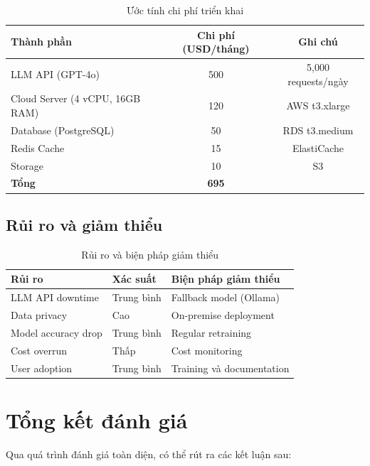 \documentclass[12pt,a4paper]{report}
\begin{document}
\begin{table}[H]
\centering
\caption{Ước tính chi phí triển khai}
\begin{tabular}{|p{5cm}|c|c|}
\hline
\textbf{Thành phần} & \textbf{Chi phí (USD/tháng)} & \textbf{Ghi chú} \\
\hline
LLM API (GPT-4o) & 500 & 5,000 requests/ngày \\
\hline
Cloud Server (4 vCPU, 16GB RAM) & 120 & AWS t3.xlarge \\
\hline
Database (PostgreSQL) & 50 & RDS t3.medium \\
\hline
Redis Cache & 15 & ElastiCache \\
\hline
Storage & 10 & S3 \\
\hline
\textbf{Tổng} & \textbf{695} & \\
\hline
\end{tabular}
\label{tab:cost_estimate}
\end{table}

\subsection{Rủi ro và giảm thiểu}

\begin{table}[H]
\centering
\caption{Rủi ro và biện pháp giảm thiểu}
\begin{tabular}{|p{4.5cm}|p{4.5cm}|p{5cm}|}
\hline
\textbf{Rủi ro} & \textbf{Xác suất} & \textbf{Biện pháp giảm thiểu} \\
\hline
LLM API downtime & Trung bình & Fallback model (Ollama) \\
\hline
Data privacy & Cao & On-premise deployment \\
\hline
Model accuracy drop & Trung bình & Regular retraining \\
\hline
Cost overrun & Thấp & Cost monitoring \\
\hline
User adoption & Trung bình & Training và documentation \\
\hline
\end{tabular}
\label{tab:risks_mitigation}
\end{table}

\section{Tổng kết đánh giá}

Qua quá trình đánh giá toàn diện, có thể rút ra các kết luận sau:
\end{document}
